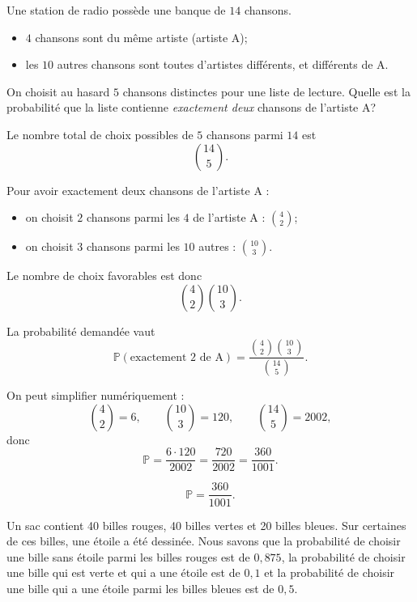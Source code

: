 \begin{questions}
\pageblanche
\question[10]


Une station de radio possède une banque de \(14\) chansons.
\begin{itemize}
\item \(4\) chansons sont du même artiste (artiste A);
\item les \(10\) autres chansons sont toutes d’artistes différents, et différents de A.
\end{itemize}

On choisit au hasard \(5\) chansons distinctes pour une liste de lecture. Quelle est la probabilité que la liste contienne \emph{exactement deux} chansons de l’artiste A?

\begin{solution}
Le nombre total de choix possibles de \(5\) chansons parmi \(14\) est
\[
\binom{14}{5}.
\]

Pour avoir exactement deux chansons de l’artiste A :
\begin{itemize}
\item on choisit \(2\) chansons parmi les \(4\) de l’artiste A : \(\binom{4}{2}\);
\item on choisit \(3\) chansons parmi les \(10\) autres : \(\binom{10}{3}\).
\end{itemize}

Le nombre de choix favorables est donc
\[
\binom{4}{2}\binom{10}{3}.
\]

La probabilité demandée vaut
\[
\mathbb{P}(\text{exactement 2 de A})
=
\frac{\binom{4}{2}\binom{10}{3}}{\binom{14}{5}}.
\]

On peut simplifier numériquement :
\[
\binom{4}{2}=6,\qquad \binom{10}{3}=120,\qquad \binom{14}{5}=2002,
\]
donc
\[
\mathbb{P}=\frac{6\cdot 120}{2002}=\frac{720}{2002}=\frac{360}{1001}.
\]

\[
\boxed{\mathbb{P}=\frac{360}{1001}.}
\]
\end{solution}


 \pageblanche



 \pageblanche

\pageblanche
\question[]

Un sac contient 40 billes rouges, 40 billes vertes et 20 billes bleues.
Sur certaines de ces billes, une étoile a été dessinée.
Nous savons que la probabilité de choisir une bille sans étoile parmi les billes rouges est de $0,875$, la probabilité de choisir une bille qui est verte et qui a une étoile est de $0,1$ et la probabilité de choisir une bille qui a une étoile parmi les billes bleues est de $0,5$.


\end{questions}
